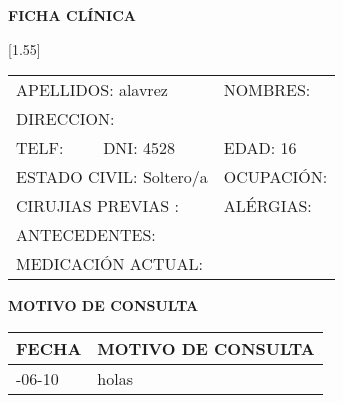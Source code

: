 \documentclass[10pt,a4paper]{article}
\begin{document}
\begin{center}
\LARGE{\textbf{FICHA CL\'INICA}}
\end{center}
\scalebox{1.40}[1.55]{
\begin{tabular}{p{2.8cm}p{2.8cm}p{6.5cm}}
\multicolumn{2}{p{6cm}}{\scriptsize{APELLIDOS: alavrez }} & \scriptsize{NOMBRES:  } \\
\multicolumn{3}{p{13cm}}{\scriptsize{DIRECCION: }} \\
\scriptsize{TELF: } & \scriptsize{DNI: 4528} & \scriptsize{EDAD: 16} \\
\multicolumn{2}{p{6cm}}{\scriptsize{ESTADO CIVIL: Soltero/a}} & \scriptsize{OCUPACI\'ON: } \\
\multicolumn{2}{p{6 cm}}{\scriptsize{CIRUJIAS PREVIAS :}} & \scriptsize{AL\'ERGIAS: } \\
\multicolumn{3}{p{13 cm}}{\scriptsize{ANTECEDENTES: }} \\
\multicolumn{3}{p{13 cm}}{\scriptsize{MEDICACI\'ON ACTUAL: }} \\
\end{tabular}}
\vspace{0.3cm}
\begin{center}
\LARGE{\textbf{MOTIVO DE CONSULTA}}
\end{center}
\begin{center}
\begin{longtable}{ p{2cm}| p{14.5cm}}
\hline
\endfirsthead
\textbf{FECHA} & \textbf{MOTIVO DE CONSULTA}\\\hline
\endhead
\endfoot
\endlastfoot
2016-06-10&holas\\
\hline
\end{longtable}
\end{center}
\end{document}
